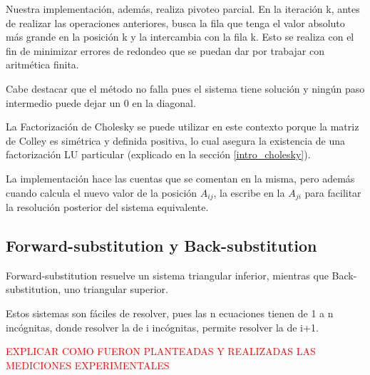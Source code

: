 Nuestra implementaci\'on, adem\'as, realiza pivoteo parcial. En la iteraci\'on k, antes de realizar las operaciones anteriores, busca la fila que tenga el valor absoluto m\'as grande en la posici\'on k y la intercambia con la fila k. Esto se realiza con el fin de minimizar errores de redondeo que se puedan dar por trabajar con aritm\'etica finita.

Cabe destacar que el m\'etodo no falla pues el sistema tiene soluci\'on y ning\'un paso intermedio puede dejar un 0 en la diagonal.

La Factorizaci\'on de Cholesky se puede utilizar en este contexto porque la matriz de Colley es sim\'etrica y definida positiva, lo cual asegura la existencia de una factorizaci\'on LU particular (explicado en la secci\'on \ref{intro_cholesky}).

La implementaci\'on hace las cuentas que se comentan en la misma, pero adem\'as cuando calcula el nuevo valor de la posici\'on $A_{ij}$, la escribe en la $A_{ji}$ para facilitar la resoluci\'on posterior del sistema equivalente.

\subsection{Forward-substitution y Back-substitution}
Forward-substitution resuelve un sistema triangular inferior, mientras que Back-substitution, uno triangular superior.

Estos sistemas son f\'aciles de resolver, pues las n ecuaciones tienen de 1 a n inc\'ognitas, donde resolver la de i inc\'ognitas, permite resolver la de i+1.

\textcolor{red}{EXPLICAR COMO FUERON PLANTEADAS Y REALIZADAS LAS MEDICIONES EXPERIMENTALES}